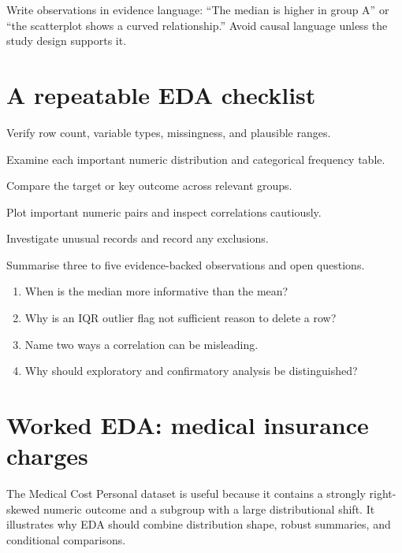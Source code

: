 \begin{keyidea}
Write observations in evidence language: ``The median is higher in group A'' or ``the scatterplot shows a curved relationship.'' Avoid causal language unless the study design supports it.
\end{keyidea}

\section{A repeatable EDA checklist}
\begin{utpsteps}
  \item Verify row count, variable types, missingness, and plausible ranges.
  \item Examine each important numeric distribution and categorical frequency table.
  \item Compare the target or key outcome across relevant groups.
  \item Plot important numeric pairs and inspect correlations cautiously.
  \item Investigate unusual records and record any exclusions.
  \item Summarise three to five evidence-backed observations and open questions.
\end{utpsteps}

\begin{quickcheck}
\begin{enumerate}
  \item When is the median more informative than the mean?
  \item Why is an IQR outlier flag not sufficient reason to delete a row?
  \item Name two ways a correlation can be misleading.
  \item Why should exploratory and confirmatory analysis be distinguished?
\end{enumerate}
\end{quickcheck}

\section{Worked EDA: medical insurance charges}

The Medical Cost Personal dataset is useful because it contains a strongly right-skewed numeric outcome and a subgroup with a large distributional shift. It illustrates why EDA should combine distribution shape, robust summaries, and conditional comparisons.

